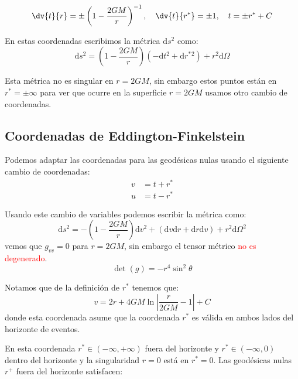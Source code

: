\documentclass[../main]{subfiles}
\begin{document}
\begin{adjustwidth}{0pt}{-100pt}
\begin{equation}
    \dv{t}{r}=\pm\left(1-\dfrac{2GM}{r}\right)^{-1},\quad \dv{t}{r^*}=\pm 1,\quad t=\pm r^*+C
\end{equation}

En estas coordenadas escribimos la métrica $\mathrm{d}s^2$ como:
\begin{equation}
    \mathrm{d}s^2=\left(1-\dfrac{2GM}{r}\right)(-\mathrm{d}t^2+\mathrm{d}r^*{}^2)+r^2\mathrm{d}\Omega
\end{equation}

Esta métrica no es singular en $r=2GM$, sin embargo estos puntos están en $r^*=\pm \infty$ para ver que ocurre en la superficie $r=2GM$ usamos otro cambio de coordenadas.

\subsection{Coordenadas de Eddington-Finkelstein}

Podemos adaptar las coordenadas para las geodésicas nulas usando el siguiente cambio de coordenadas:
\begin{equation}
    \begin{split}
        v&=t+r^*\\
        u&=t-r^*
    \end{split}
\end{equation} 

Usando este cambio de variables podemos escribir la métrica como:
\begin{equation}
    \mathrm{d}s^2=-\left(1-\dfrac{2GM}{r}\right)\mathrm{d}v^2+(\mathrm{d}v\mathrm{d}r+\mathrm{d}r\mathrm{d}v)+r^2\mathrm{d}\Omega^2
\end{equation}
vemos que $g_{vv}=0$ para $r=2GM$, sin embargo el tensor métrico \textcolor{red}{no es degenerado}.
\begin{equation}
    \det(g)=-r^4 \sin^2 \theta
\end{equation}

Notamos que de la definición de $r^*$ tenemos que:
\begin{equation}
    v=2r+4GM\ln \left| \dfrac{r}{2GM}-1 \right|+C
\end{equation}
donde esta coordenada asume que la coordenada $r^*$ es válida en ambos lados del horizonte de eventos.

En esta coordenada $r^* \in (-\infty, +\infty)$ fuera del horizonte y $r^* \in (-\infty, 0)$ dentro del horizonte y la singularidad $r=0$ está en $r^*=0$. Las geodésicas nulas $r^+$ fuera del horizonte satisfacen:


\end{adjustwidth}
\end{document}
